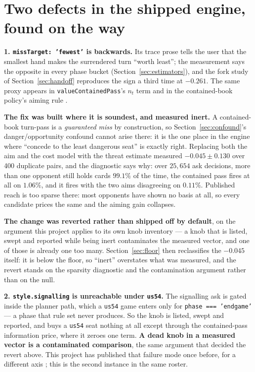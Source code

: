 \documentclass[11pt]{article}
\newcommand{\code}[1]{\texttt{#1}}
\newcommand{\usff}{\code{us54}}
\begin{document}
\section{Two defects in the shipped engine, found on the way}
\label{sec:defects}

\textbf{1. \code{missTarget: 'fewest'} is backwards.} Its trace prose tells the user that the
smallest hand makes the surrendered turn ``worth least''; the measurement says the opposite in every
phase bucket (Section~\ref{sec:estimators}), and the fork study of Section~\ref{sec:handoff}
reproduces the sign a third time at $-0.261$. The same proxy appears in \code{valueContainedPass}'s
$n_t$ term and in the contained-book policy's aiming rule \cite{containedpaper}.

\textbf{The fix was built where it is soundest, and measured inert.} A contained-book turn-pass is a
\emph{guaranteed miss} by construction, so Section~\ref{sec:confound}'s danger/opportunity confound
cannot arise there: it is the one place in the engine where ``concede to the least dangerous seat''
is exactly right. Replacing both the aim and the cost model with the threat estimate measured
$-0.045 \pm 0.130$ over 400 duplicate pairs, and the diagnostic says why: over $25{,}654$ ask
decisions, more than one opponent still holds cards $99.1\%$ of the time, the contained pass fires
at all on $\mathbf{1.06\%}$, and it fires with the two aims disagreeing on $\mathbf{0.11\%}$.
Published reach is too sparse there: most opponents have shown no basis at all, so every candidate
prices the same and the aiming gain collapses.

\textbf{The change was reverted rather than shipped off by default}, on the argument this project
applies to its own knob inventory --- a knob that is listed, swept and reported while being inert
contaminates the measured vector, and one of those is already one too many. Section~\ref{sec:floor}
then reclassifies the $-0.045$ itself: it is below the floor, so ``inert'' overstates what was
measured, and the revert stands on the sparsity diagnostic and the contamination argument rather
than on the null.

\textbf{2. \code{style.signalling} is unreachable under \usff{}.} The signalling ask is gated inside
the planner path, which a \usff{} game enters only for \code{phase === 'endgame'} --- a phase that
rule set never produces. So the knob is listed, swept and reported, and buys a \usff{} seat nothing
at all except through the contained-pass information price, where it zeroes one term. \textbf{A dead
knob in a measured vector is a contaminated comparison}, the same argument that decided the revert
above. This project has published that failure mode once before, for a different axis
\cite{inertpaper}; this is the second instance in the same roster.
\end{document}
